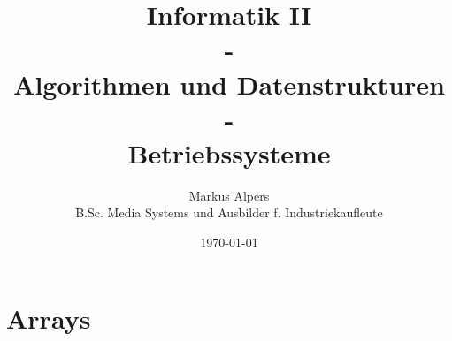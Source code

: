 \documentclass[11pt, a4paper, oneside, draft]{book}
\begin{document}

\title{Informatik II\\-\\Algorithmen und Datenstrukturen\\-\\Betriebssysteme}
\author{Markus Alpers\\B.Sc. Media Systems und Ausbilder f. Industriekaufleute}
\date{\today}

\maketitle


\tableofcontents



\part{Arrays}


%
%





\renewcommand{\indexname}{Stichwortverzeichnis}		%
\printindex
\end{document}
